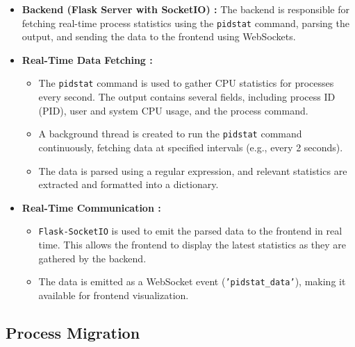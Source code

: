 \documentclass[12pt]{article}
\begin{document}
\begin{itemize}
\item {\bf Backend (Flask Server with SocketIO) :}
The backend is responsible for fetching real-time process statistics using the \texttt{pidstat} command, parsing the output, and sending the data to the frontend using WebSockets.

\item{\bf Real-Time Data Fetching :}
\begin{itemize}
    \item The \texttt{pidstat} command is used to gather CPU statistics for processes every second. The output contains several fields, including process ID (PID), user and system CPU usage, and the process command.
    \item A background thread is created to run the \texttt{pidstat} command continuously, fetching data at specified intervals (e.g., every 2 seconds).
    \item The data is parsed using a regular expression, and relevant statistics are extracted and formatted into a dictionary.
\end{itemize}

\item{\bf Real-Time Communication :}
\begin{itemize}
    \item \texttt{Flask-SocketIO} is used to emit the parsed data to the frontend in real time. This allows the frontend to display the latest statistics as they are gathered by the backend.
    \item The data is emitted as a WebSocket event (\texttt{'pidstat\_data'}), making it available for frontend visualization.
\end{itemize}
\end{itemize}
\subsection{Process Migration}
\end{document}
